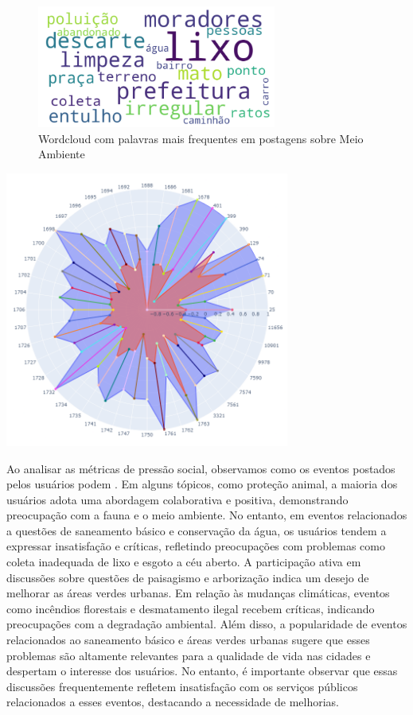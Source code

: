 \begin{figure}[htb]
	\centering
	\includegraphics[width=0.7\textwidth]{images/wordcloud_environment.png}
	\caption{Wordcloud com palavras mais frequentes em postagens sobre Meio Ambiente}
	\label{fig:wordcloud_environment}
\end{figure}

\begin{quadro}[htb]
	\centering
	\includegraphics[width=0.7\textwidth]{images/social_barometer_environment.png}
	\caption{Gráfico de Radar ilustrando a pressão social em relação ao tópico de Meio Ambiente}
	\label{fig:social_barometer_environment}
\end{quadro}

Ao analisar as métricas de pressão social, observamos como os eventos postados pelos usuários podem . Em alguns tópicos, como proteção animal, a maioria dos usuários adota uma abordagem colaborativa e positiva, demonstrando preocupação com a fauna e o meio ambiente. No entanto, em eventos relacionados a questões de saneamento básico e conservação da água, os usuários tendem a expressar insatisfação e críticas, refletindo preocupações com problemas como coleta inadequada de lixo e esgoto a céu aberto. A participação ativa em discussões sobre questões de paisagismo e arborização indica um desejo de melhorar as áreas verdes urbanas. Em relação às mudanças climáticas, eventos como incêndios florestais e desmatamento ilegal recebem críticas, indicando preocupações com a degradação ambiental. Além disso, a popularidade de eventos relacionados ao saneamento básico e áreas verdes urbanas sugere que esses problemas são altamente relevantes para a qualidade de vida nas cidades e despertam o interesse dos usuários. No entanto, é importante observar que essas discussões frequentemente refletem insatisfação com os serviços públicos relacionados a esses eventos, destacando a necessidade de melhorias.

